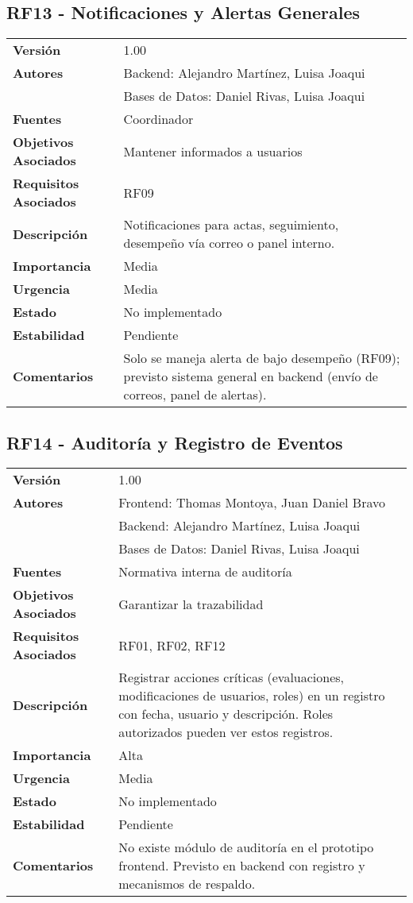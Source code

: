 \documentclass{article}
\begin{document}
\subsection*{RF13 - Notificaciones y Alertas Generales}
\begin{longtable}{>{\bfseries}l p{}}
Versión & 1.00 \\
Autores & Backend: Alejandro Martínez, Luisa Joaqui \\ 
        & Bases de Datos: Daniel Rivas, Luisa Joaqui \\
Fuentes & Coordinador \\
Objetivos Asociados & Mantener informados a usuarios \\
Requisitos Asociados & RF09 \\
Descripción & Notificaciones para actas, seguimiento, desempeño vía correo o panel interno. \\
Importancia & Media \\
Urgencia & Media \\
Estado & No implementado \\
Estabilidad & Pendiente \\
Comentarios & Solo se maneja alerta de bajo desempeño (RF09); previsto sistema general en backend (envío de correos, panel de alertas). \\
\end{longtable}

\subsection*{RF14 - Auditoría y Registro de Eventos}
\begin{longtable}{>{\bfseries}l p{}}
Versión & 1.00 \\
Autores & Frontend: Thomas Montoya, Juan Daniel Bravo \\ 
        & Backend: Alejandro Martínez, Luisa Joaqui \\ 
        & Bases de Datos: Daniel Rivas, Luisa Joaqui \\
Fuentes & Normativa interna de auditoría \\
Objetivos Asociados & Garantizar la trazabilidad \\
Requisitos Asociados & RF01, RF02, RF12 \\
Descripción & Registrar acciones críticas (evaluaciones, modificaciones de usuarios, roles) en un registro con fecha, usuario y descripción. Roles autorizados pueden ver estos registros. \\
Importancia & Alta \\
Urgencia & Media \\
Estado & No implementado \\
Estabilidad & Pendiente \\
Comentarios & No existe módulo de auditoría en el prototipo frontend. Previsto en backend con registro y mecanismos de respaldo. \\
\end{longtable}
\end{document}
